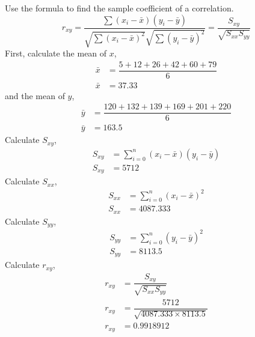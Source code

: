 \documentclass[12pt]{book}
\begin{document}
\begin{enumerate}
\begin{enumerate}
        Use the formula to find the sample coefficient of a correlation.
        $$r_{xy} = \dfrac{\sum (x_i - \bar{x}) (y_i - \bar{y})}{\sqrt{\sum \left(x_i - \bar{x}\right)^2} \sqrt{\sum \left(y_i - \bar{y}\right)^2}} = \dfrac{S_{xy}}{\sqrt{S_{xx} S_{yy}}}$$
        First, calculate the mean of $x$,
        \begin{align*}
            \bar{x} &= \dfrac{5 + 12 + 26 + 42 + 60 + 79}{6}\\
            \bar{x} &= 37.33
        \end{align*}
        and the mean of $y$,
        \begin{align*}
            \bar{y} &= \dfrac{120 + 132 + 139 + 169 + 201 + 220}{6}\\
            \bar{y} &= 163.5
        \end{align*}
        Calculate $S_{xy}$,
        \begin{align*}
            S_{xy} &= \sum_{i=0}^n (x_i - \bar{x}) (y_i - \bar{y})\\
            S_{xy} &= 5712
        \end{align*}
        Calculate $S_{xx}$,
        \begin{align*}
            S_{xx} &= \sum_{i=0}^n \left(x_i - \bar{x}\right)^2\\
            S_{xx} &= 4087.333
        \end{align*}
        Calculate $S_{yy}$,
        \begin{align*}
            S_{yy} &= \sum_{i=0}^n \left(y_i - \bar{y}\right)^2\\
            S_{yy} &= 8113.5
        \end{align*}
        Calculate $r_{xy}$,
        \begin{align*}
            r_{xy} &= \dfrac{S_{xy}}{\sqrt{S_{xx} S_{yy}}}\\
            r_{xy} &= \dfrac{5712}{\sqrt{4087.333 \times 8113.5}}\\
            r_{xy} &= 0.9918912
        \end{align*}
        

\end{enumerate}
\end{enumerate}
\end{document}

